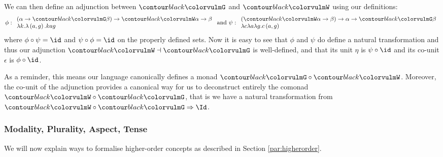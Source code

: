 We can then define an adjunction between $\f G$ and $\f W$ using our definitions:
\begin{equation*}
	\phi: \begin{array}{l}
		\left( \alpha \to \f{G}\beta \right)\to \f{W}\alpha \to \beta \\
		\lambda k. \lambda \left( a, g \right) . k a g
	\end{array}
	\text{ and }
	\psi: \begin{array}{l}
		\left( \f{W}\alpha \to \beta \right) \to \alpha \to \f{G} \beta \\
		\lambda c \lambda a \lambda g. c \left( a, g \right)
	\end{array}
\end{equation*}
where $\phi \circ \psi = \id$ and $\psi \circ \phi = \id$ on the properly defined sets.
Now it is easy to see that $\phi$ and $\psi$ do define a natural transformation and thus our adjunction $\f{W} \dashv \f{G}$ is well-defined, and that its unit $\eta$ is $\psi \circ \id$ and its co-unit $\epsilon$ is $\phi \circ \id$.

As a reminder, this means our language canonically defines a monad $\f{G}\circ \f{W}$.
Moreover, the co-unit of the adjunction provides a canonical way for us to deconstruct entirely the comonad $\f{W}\circ \f{G} $, that is we have a natural transformation from $\f{W} \circ \f{G} \Rightarrow \Id$.

\subsubsection{Modality, Plurality, Aspect, Tense}\label{subsec:modality}
We will now explain ways to formalise higher-order concepts as described in Section \ref{par:higherorder}.

